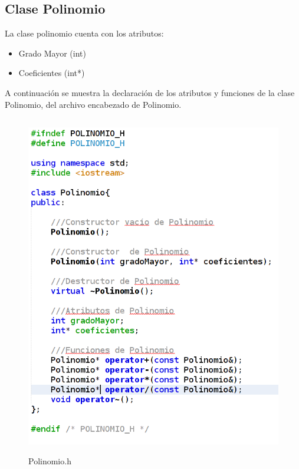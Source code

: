 \documentclass[11pt]{article}
\begin{document}
\subsection{Clase Polinomio}
La clase polinomio cuenta con los atributos:
\begin{itemize}
\item Grado Mayor (int)
\item Coeficientes (int*)
\end{itemize}

A continuación se muestra la declaración de los atributos y funciones de la clase Polinomio, del archivo encabezado de Polinomio.

\begin{figure}[H]
\centering
\includegraphics[height=15cm, width=\textwidth]{img/HeaderPolinomio.png}
\caption{Polinomio.h}
\label{fig:polh}
\end{figure}
\end{document}
